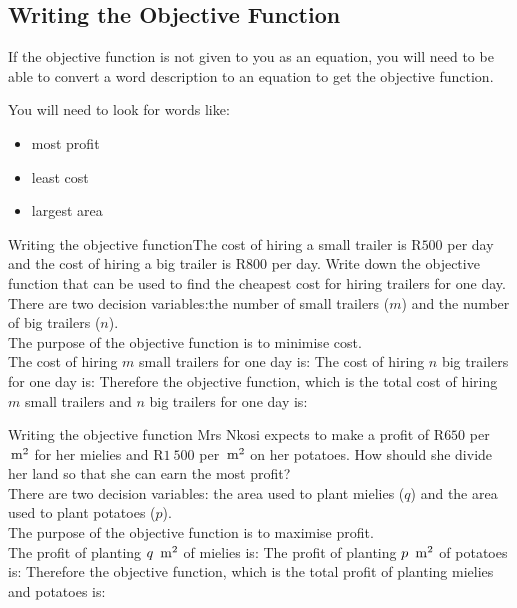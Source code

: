 \subsection{Writing the Objective Function}
If the objective function is not given to you as an equation, you will need to be able to convert a word description to an equation to get the objective function. 

You will need to look for words like:
\begin{itemize}
\item{most profit}
\item{least cost}
\item{largest area}
\end{itemize}

\begin{wex}
{Writing the objective function}{The cost of hiring a small trailer is R$500$ per day and the cost of hiring a big trailer is R$800$ per day. Write down the objective function that can be used to find the cheapest cost for hiring trailers for one day.\\}
{
There are two decision variables:the number of small trailers ($m$) and the number of big trailers ($n$).\\

The purpose of the objective function is to minimise cost.\\

The cost of hiring $m$ small trailers for one day is:
The cost of hiring $n$ big trailers for one day is:
Therefore the objective function, which is the total cost of hiring $m$ small trailers and $n$ big trailers for one day is:
}
\end{wex}

\begin{wex}
{Writing the objective function}{
Mrs Nkosi expects to make a profit of R$650$ per $\,\rm{m}^2$ for her mielies and R$1~500$ per $\,\rm{m}^2$ on her potatoes. How should she divide her land so that she can earn the most profit?\\}
{
There are two decision variables: the area used to plant mielies ($q$) and the area used to plant potatoes ($p$).\\

The purpose of the objective function is to maximise profit.\\

The profit of planting $q ~\,\rm{m}^2$ of mielies is:
The profit of planting $p~\,\rm{m}^2$ of potatoes is:
Therefore the objective function, which is the total profit of planting mielies and potatoes is:
}
\end{wex}

